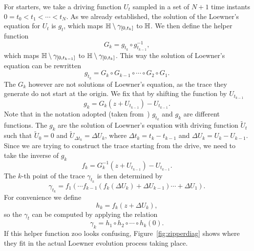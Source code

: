 For starters, we take a driving function $U_t$ sampled in a set of $N+1$ time
instants $0=t_0<t_1<\cdots<t_N$. As we already established, the solution of the
Loewner's equation for $U_t$ is $g_t$, which maps
$\mathbb{H}\setminus\gamma_{\left[0,t_{k}\right]}$ to $\mathbb{H}$. We then define the
helper function
\begin{equation}
    G_{k}=g_{t_{k}}\circ g_{t_{k-1}}^{-1},
\end{equation}
which maps $\mathbb{H}\setminus\gamma_{\left[0,t_{k-1}\right]}$ to
$\mathbb{H}\setminus\gamma_{\left[0,t_{k}\right]}$. This way the solution of Loewner's
equation can be rewritten
\begin{equation}
    g_{t_{k}}=G_{k}\circ G_{k-1}\circ\cdots\circ G_{2}\circ G_{1}.
\end{equation}
The $G_k$ however are not solutions of Loewner's equation, as the trace they
generate do not start at the origin. We fix that by shifting the function by
$U_{t_{k-1}}$
\begin{equation}
    g_{k}=G_{k}\left(z+U_{t_{k-1}}\right)-U_{t_{k-1}}.
\end{equation}
Note that in the notation adopted (taken from~\cite{Kennedy2009}) $g_{t_k}$ and
$g_k$ are different functions. The $g_k$ are the solution of Loewner's equation
with driving function $\tilde{U}_t$ such that $\tilde{U}_0=0$ and
$\tilde{U}_{\Delta t_k} = \Delta U_k$, where $\Delta t_k = t_{k} - t_{k-1}$ and
$\Delta U_{k} = U_{k} - U_{k-1}$. Since we are trying to construct the trace
starting from the drive, we need to take the inverse of $g_k$
\begin{equation}
    f_{k}=G_{k}^{-1}\left(z+U_{t_{k-1}}\right)-U_{t_{k-1}}.
\end{equation}
The $k$-th point of the trace $\gamma_{t_k}$ is then determined by 
\begin{equation}
    \gamma_{t_k} = f_1(\cdots f_{k-1}(f_k(\Delta U_k)+\Delta U_{k-1})\cdots+\Delta U_1).
\end{equation}
For convenience we define
\begin{equation}
    h_{k}=f_{k}\left(z+\Delta U_{k}\right),
\end{equation}
so the $\gamma_t$ can be computed by applying the relation
\begin{equation}
    \label{eq:zip}
    \gamma_{k}=h_{1}\circ h_{2}\circ\cdots\circ h_{k}\left(0\right).
\end{equation}
If this helper function zoo looks confusing, Figure~\ref{fig:zipperdiag} shows
where they fit in the actual Loewner evolution process taking place.

